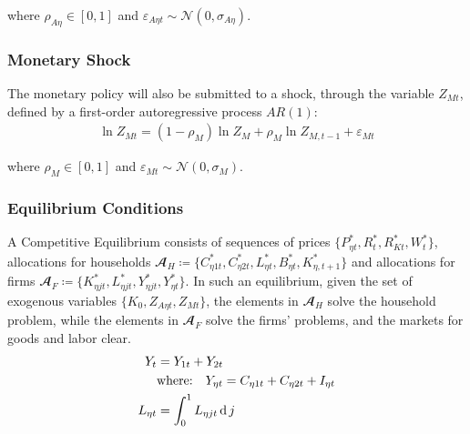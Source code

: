 \documentclass[
thesis.tex
]{subfiles}
\begin{document}
where $\rho_{A\eta} \in [0,1]$ and $\varepsilon_{A\eta t} \sim \mathscr{N}(0,\sigma_{A\eta})$.

\subsubsection*{Monetary Shock} \label{sec:reg-monetary-shock}

The monetary policy will also be submitted to a shock, through the variable $Z_{Mt}$, defined by a first-order autoregressive process $AR(1)$:
\begin{align}
	\ln{Z_{Mt}} = (1-\rho_M)\ln{Z_{M}} + \rho_M\ln{Z_{M,t-1}} + \varepsilon_{Mt} \label{eq:reg-monetary-shock}
\end{align}

where $\rho_M \in [0,1]$ and $\varepsilon_{Mt} \sim \mathscr{N}(0,\sigma_M)$.


\subsubsection{Equilibrium Conditions}


A Competitive Equilibrium consists of sequences of prices $\{P_{\eta t}^{\ast}, R_t^{\ast}, R_{Kt}^{\ast}, W_t^{\ast}\}$, allocations for households $\mathbfscr{A}_H \coloneq \{C_{\eta 1 t}^{\ast}, C_{\eta 2 t}^{\ast}, L_{\eta t}^{\ast}, B_{\eta t}^{\ast}, K_{\eta, t+1}^{\ast}\}$ and allocations  for firms $\mathbfscr{A}_F \coloneq \{K_{\eta jt}^{\ast}, L_{\eta jt}^{\ast}, Y_{\eta jt}^{\ast}, Y_{\eta t}^{\ast}\}$. In such an equilibrium, given the set of exogenous variables $\{K_0, Z_{A\eta t}, Z_{Mt}\}$, the elements in $\mathbfscr{A}_H$ solve the household problem, while the elements in $\mathbfscr{A}_F$ solve the firms' problems, and the markets for goods and labor clear.
\begin{align}
	Y_{t} &= Y_{1 t} + Y_{2 t} \label{eq:reg-market-clearing-condition-Yt} \\
	& \text{where:} \quad Y_{\eta t} = C_{\eta 1 t} + C_{\eta 2 t} + I_{\eta t} \label{eq:reg-regional-demand} \\
	L_{\eta t} &= \int_{0}^{1} L_{\eta jt} \operatorname{d} j \label{eq:reg-market-clearing-condition-Lt}
\end{align}
\end{document}
